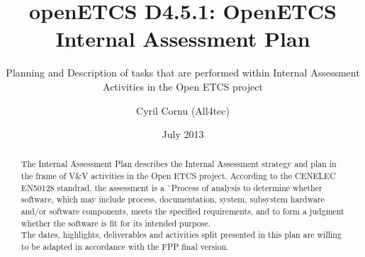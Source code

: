 \documentclass{template/openetcs_article}
\begin{document}
\frontmatter
{}




\title{openETCS D4.5.1: OpenETCS Internal Assessment Plan}

\subtitle{Planning and Description of tasks that are performed within Internal Assessment Activities in the Open ETCS project}

\date{July 2013}

\author{Cyril Cornu (All4tec)}






\begin{abstract}
The Internal Assessment Plan describes the Internal Assessment strategy and plan in the frame of V\&V activities in the Open ETCS project.
According to the CENELEC EN50128 standrad, the assessment is a \"\ Process of analysis to determine whether software, which may include process, documentation, system, subsystem hardware and/or software components, meets the specified requirements, and to form a judgment whether the software is fit for its intended purpose.\"
\\
The dates, highlights, deliverables and activities split presented in this plan are willing to be adapted in accordance with the FPP final version.
\end{abstract}

\maketitle
\setcounter{tocdepth}{2}
\tableofcontents
\newpage
\end{document}
